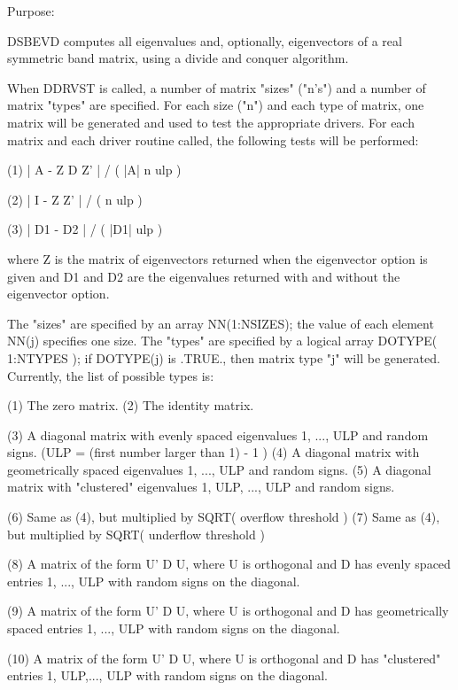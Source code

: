 \begin{DoxyParagraph}{Purpose\+: }
\begin{DoxyVerb}
              DSBEVD computes all eigenvalues and, optionally,
              eigenvectors of a real symmetric band matrix,
              using a divide and conquer algorithm.

      When DDRVST is called, a number of matrix "sizes" ("n's") and a
      number of matrix "types" are specified.  For each size ("n")
      and each type of matrix, one matrix will be generated and used
      to test the appropriate drivers.  For each matrix and each
      driver routine called, the following tests will be performed:

      (1)     | A - Z D Z' | / ( |A| n ulp )

      (2)     | I - Z Z' | / ( n ulp )

      (3)     | D1 - D2 | / ( |D1| ulp )

      where Z is the matrix of eigenvectors returned when the
      eigenvector option is given and D1 and D2 are the eigenvalues
      returned with and without the eigenvector option.

      The "sizes" are specified by an array NN(1:NSIZES); the value of
      each element NN(j) specifies one size.
      The "types" are specified by a logical array DOTYPE( 1:NTYPES );
      if DOTYPE(j) is .TRUE., then matrix type "j" will be generated.
      Currently, the list of possible types is:

      (1)  The zero matrix.
      (2)  The identity matrix.

      (3)  A diagonal matrix with evenly spaced eigenvalues
           1, ..., ULP  and random signs.
           (ULP = (first number larger than 1) - 1 )
      (4)  A diagonal matrix with geometrically spaced eigenvalues
           1, ..., ULP  and random signs.
      (5)  A diagonal matrix with "clustered" eigenvalues
           1, ULP, ..., ULP and random signs.

      (6)  Same as (4), but multiplied by SQRT( overflow threshold )
      (7)  Same as (4), but multiplied by SQRT( underflow threshold )

      (8)  A matrix of the form  U' D U, where U is orthogonal and
           D has evenly spaced entries 1, ..., ULP with random signs
           on the diagonal.

      (9)  A matrix of the form  U' D U, where U is orthogonal and
           D has geometrically spaced entries 1, ..., ULP with random
           signs on the diagonal.

      (10) A matrix of the form  U' D U, where U is orthogonal and
           D has "clustered" entries 1, ULP,..., ULP with random
           signs on the diagonal.


\end{DoxyVerb}
\end{DoxyParagraph}
